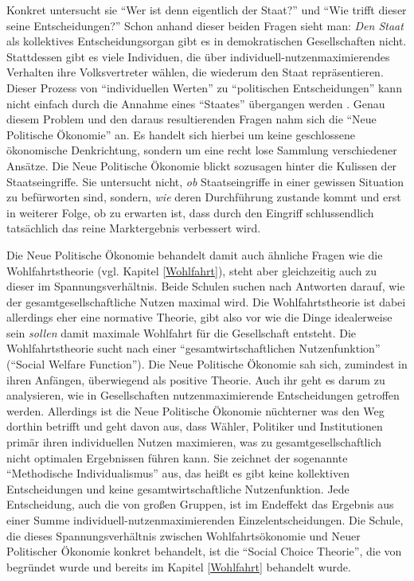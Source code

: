 Konkret untersucht sie "`Wer ist denn eigentlich der Staat?"' und "`Wie trifft dieser seine Entscheidungen?"' Schon anhand dieser beiden Fragen sieht man: \textit{Den Staat} als kollektives Entscheidungsorgan gibt es in demokratischen Gesellschaften nicht. Stattdessen gibt es viele Individuen, die über individuell-nutzenmaximierendes Verhalten ihre Volksvertreter wählen, die wiederum den Staat repräsentieren. Dieser Prozess von "`individuellen Werten"' zu "`politischen Entscheidungen"' kann nicht einfach durch die Annahme eines "`Staates"' übergangen werden \parencite[S. 11]{Buchanan1962}. Genau diesem Problem und den daraus resultierenden Fragen nahm sich die "`Neue Politische Ökonomie"' an. Es handelt sich hierbei um keine geschlossene ökonomische Denkrichtung, sondern um eine recht lose Sammlung verschiedener Ansätze. Die Neue Politische Ökonomie blickt sozusagen hinter die Kulissen der Staatseingriffe. Sie untersucht nicht, \textit{ob} Staatseingriffe in einer gewissen Situation zu befürworten sind, sondern, \textit{wie} deren Durchführung zustande kommt und erst in weiterer Folge, ob zu erwarten ist, dass durch den Eingriff schlussendlich tatsächlich das reine Marktergebnis verbessert wird.

Die Neue Politische Ökonomie behandelt damit auch ähnliche Fragen wie die Wohlfahrtstheorie (vgl. Kapitel \ref{Wohlfahrt}), steht aber gleichzeitig auch zu dieser im Spannungsverhältnis. Beide Schulen suchen nach Antworten darauf, wie der gesamtgesellschaftliche Nutzen maximal wird. Die Wohlfahrtstheorie ist dabei allerdings eher eine normative Theorie, gibt also vor wie die Dinge idealerweise sein \textit{sollen} damit maximale Wohlfahrt für die Gesellschaft entsteht. Die Wohlfahrtstheorie sucht nach einer "`gesamtwirtschaftlichen Nutzenfunktion"' ("`Social Welfare Function"'). Die Neue Politische Ökonomie sah sich, zumindest in ihren Anfängen, überwiegend als positive Theorie. Auch ihr geht es darum zu analysieren, wie in Gesellschaften nutzenmaximierende Entscheidungen getroffen werden. Allerdings ist die Neue Politische Ökonomie nüchterner was den Weg dorthin betrifft und geht davon aus, dass Wähler, Politiker und Institutionen primär ihren individuellen Nutzen maximieren, was zu gesamtgesellschaftlich nicht optimalen Ergebnissen führen kann. Sie zeichnet der sogenannte "`Methodische Individualismus"' aus, das heißt es gibt keine kollektiven Entscheidungen und keine gesamtwirtschaftliche Nutzenfunktion. Jede Entscheidung, auch die von großen Gruppen, ist im Endeffekt das Ergebnis aus einer Summe individuell-nutzenmaximierenden Einzelentscheidungen. Die Schule, die dieses Spannungsverhältnis zwischen Wohlfahrtsökonomie und Neuer Politischer Ökonomie konkret behandelt, ist die "`Social Choice Theorie"', die von \textcite{Arrow1950, Arrow1951} begründet wurde und bereits im Kapitel \ref{Wohlfahrt} behandelt wurde.

